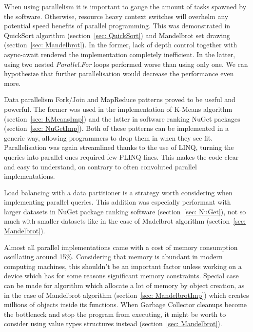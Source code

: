 When using parallelism it is important to gauge the amount of tasks spawned by the software. Otherwise, resource heavy context switches will overhelm any potential speed benefits of parallel programming. This was demonstrated in QuickSort algorithm (section~\ref{sec: QuickSort}) and Mandelbrot set drawing (section~\ref{sec: Mandelbrot}). In the former, lack of depth control together with async-await rendered the implementation completely inefficient. In the latter, using two nested \emph{Parallel.For} loops performed worse than using only one. We can hypothesize that further parallelisation would decrease the performance even more. 

Data parallelism Fork/Join and MapReduce patterns proved to be useful and powerful. The former was used in the implementation of K-Means algorithm (section~\ref{sec: KMeansImp}) and the latter in software ranking NuGet packages (section~\ref{sec: NuGetImp}). Both of these patterns can be implemented in a generic way, allowing programmers to drop them in when they see fit. Parallelisation was again streamlined thanks to the use of LINQ, turning the queries into parallel ones required few PLINQ lines. This makes the code clear and easy to understand, on contrary to often convoluted parallel implementations. 

Load balancing with a data partitioner is a strategy worth considering when implementing parallel queries. This addition was especially performant with larger datasets in NuGet package ranking software (section~\ref{sec: NuGet}), not so much with smaller datasets like in the case of Madelbrot algorithm (section~\ref{sec: Mandelbrot}). 

Almost all parallel implementations came with a cost of memory consumption oscillating around 15\%. Considering that memory is abundant in modern computing machines, this shouldn't be an important factor unless working on a device which has for some reasons significant memory constraints. Special case can be made for algorithm which allocate a lot of memory by object creation, as in the case of Mandelbrot algorithm (section~\ref{sec: MandelbrotImp}) which creates millions of objects inside its functions. When Garbage Collector cleanups become the bottleneck and stop the program from executing, it might be worth to consider using value types structures instead (section~\ref{sec: Mandelbrot}).\\

